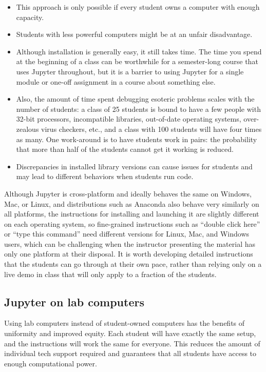 \documentclass[]{book}
\begin{document}
\begin{itemize}
\item
  This approach is only possible if every student owns a computer with
  enough capacity.
\item
  Students with less powerful computers might be at an unfair
  disadvantage.
\item
  Although installation is generally easy, it still takes time. The
  time you spend at the beginning of a class can be worthwhile for a
  semester-long course that uses Jupyter throughout, but it is a
  barrier to using Jupyter for a single module or one-off assignment
  in a course about something else.
\item
  Also, the amount of time spent debugging esoteric problems scales
  with the number of students: a class of 25 students is bound to
  have a few people with 32-bit processors, incompatible libraries,
  out-of-date operating systems, over-zealous virus checkers, etc.,
  and a class with 100 students will have four times as many. One
  work-around is to have students work in pairs: the probability
  that more than half of the students cannot get it working is
  reduced.
\item
  Discrepancies in installed library versions can cause issues for
  students and may lead to different behaviors when students run
  code.
\end{itemize}

Although Jupyter is cross-platform and ideally behaves the same on
Windows, Mac, or Linux, and distributions such as Anaconda also behave
very similarly on all platforms, the instructions for installing and
launching it are slightly different on each operating system, so
fine-grained instructions such as ``double click here'' or ``type this
command'' need different versions for Linux, Mac, and Windows users,
which can be challenging when the instructor presenting the material
has only one platform at their disposal. It is worth developing
detailed instructions that the students can go through at their own
pace, rather than relying only on a live demo in class that will only
apply to a fraction of the students.

\hypertarget{jupyter-on-lab-computers}{%
\subsection{Jupyter on lab computers}\label{jupyter-on-lab-computers}}

Using lab computers instead of student-owned computers has the
benefits of uniformity and improved equity. Each student will have
exactly the same setup, and the instructions will work the same for
everyone. This reduces the amount of individual tech support required
and guarantees that all students have access to enough computational
power.
\end{document}
